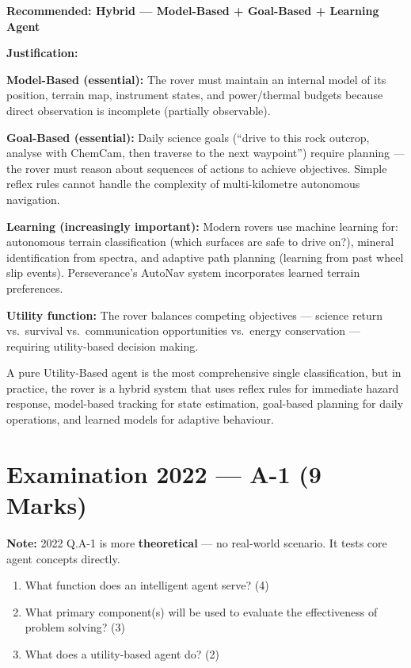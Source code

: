 \documentclass[12pt, a4paper]{article}
\newenvironment{solutionbox}{\begin{mdframed}[style=solutionframe]}{\end{mdframed}}
\newenvironment{answerbox}{\begin{mdframed}[style=answerframe]}{\end{mdframed}}
\begin{document}
\begin{answerbox}
\textbf{Recommended: Hybrid — Model-Based + Goal-Based + Learning Agent}

\noindent\textbf{Justification:}
\begin{keypoints}
  \item \textbf{Model-Based (essential):} The rover must maintain an internal model of its position, terrain map, instrument states, and power/thermal budgets because direct observation is incomplete (partially observable).
  \item \textbf{Goal-Based (essential):} Daily science goals (``drive to this rock outcrop, analyse with ChemCam, then traverse to the next waypoint'') require planning — the rover must reason about sequences of actions to achieve objectives. Simple reflex rules cannot handle the complexity of multi-kilometre autonomous navigation.
  \item \textbf{Learning (increasingly important):} Modern rovers use machine learning for: autonomous terrain classification (which surfaces are safe to drive on?), mineral identification from spectra, and adaptive path planning (learning from past wheel slip events). Perseverance's AutoNav system incorporates learned terrain preferences.
  \item \textbf{Utility function:} The rover balances competing objectives — science return vs.\ survival vs.\ communication opportunities vs.\ energy conservation — requiring utility-based decision making.
\end{keypoints}

\noindent A pure Utility-Based agent is the most comprehensive single classification, but in practice, the rover is a hybrid system that uses reflex rules for immediate hazard response, model-based tracking for state estimation, goal-based planning for daily operations, and learned models for adaptive behaviour.
\end{answerbox}

\newpage

\section{Examination 2022 — A-1 (9 Marks)}

\begin{solutionbox}
\textbf{Note:} 2022 Q.A-1 is more \textbf{theoretical} — no real-world scenario. It tests core agent concepts directly.
\begin{enumerate}[noitemsep]
  \item[(a)] What function does an intelligent agent serve? (4)
  \item[(b)] What primary component(s) will be used to evaluate the effectiveness of problem solving? (3)
  \item[(c)] What does a utility-based agent do? (2)
\end{enumerate}
\end{solutionbox}
\end{document}

